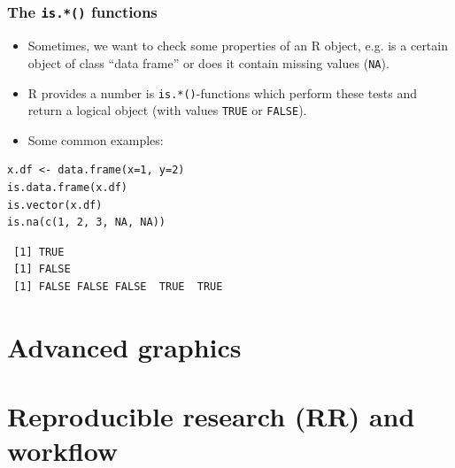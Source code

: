 \documentclass[bigger]{beamer}
\begin{document}
\subsection{}
\begin{frame}[fragile,label=slide_is_function]
\frametitle{The \texttt{is.*()} functions}
\label{sec-7-1-1}

\begin{itemize}
\item Sometimes, we want to check some properties of an R object, e.g. is a
      certain object of class \enquote{data frame} or does it contain missing values
      (\texttt{NA}).
\item R provides a number is \texttt{is.*()}-functions which perform these tests and
      return a logical object (with values \texttt{TRUE} or \texttt{FALSE}).
\item Some common examples:
\end{itemize}


\lstset{language=R}
\begin{lstlisting}
x.df <- data.frame(x=1, y=2)
is.data.frame(x.df)
is.vector(x.df)
is.na(c(1, 2, 3, NA, NA))
\end{lstlisting}

\begin{verbatim}
 [1] TRUE
 [1] FALSE
 [1] FALSE FALSE FALSE  TRUE  TRUE
\end{verbatim}
\end{frame}
\section{Advanced graphics}
\label{sec-8}
\section{Reproducible research (RR) and workflow}
\label{sec-9}
\end{document}
